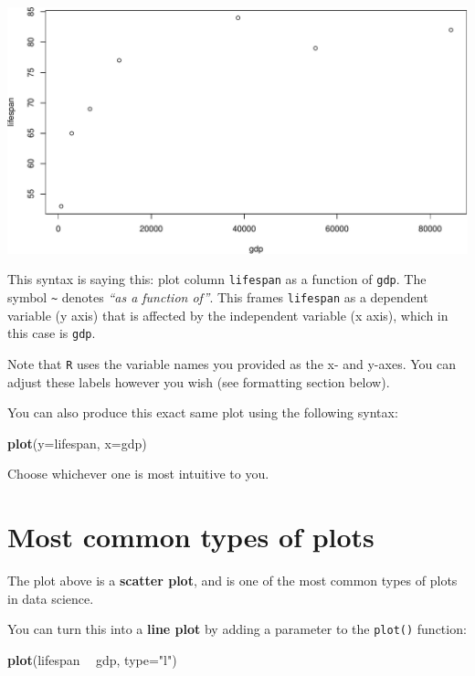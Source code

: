 \documentclass[
]{book}
\newenvironment{Shaded}{\begin{snugshade}}{\end{snugshade}}
\newcommand{\DataTypeTok}[1]{\textcolor[rgb]{0.13,0.29,0.53}{#1}}
\newcommand{\KeywordTok}[1]{\textcolor[rgb]{0.13,0.29,0.53}{\textbf{#1}}}
\newcommand{\NormalTok}[1]{#1}
\newcommand{\OperatorTok}[1]{\textcolor[rgb]{0.81,0.36,0.00}{\textbf{#1}}}
\newcommand{\StringTok}[1]{\textcolor[rgb]{0.31,0.60,0.02}{#1}}
\begin{document}
\includegraphics{figures/unnamed-chunk-95-1.pdf}

This syntax is saying this: plot column \texttt{lifespan} as a function of \texttt{gdp}. The symbol \texttt{\textasciitilde{}} denotes \emph{``as a function of''}. This frames \texttt{lifespan} as a dependent variable (y axis) that is affected by the independent variable (x axis), which in this case is \texttt{gdp}.

Note that \texttt{R} uses the variable names you provided as the x- and y-axes. You can adjust these labels however you wish (see formatting section below).

You can also produce this exact same plot using the following syntax:

\begin{Shaded}
\begin{Highlighting}[]
\KeywordTok{plot}\NormalTok{(}\DataTypeTok{y=}\NormalTok{lifespan, }\DataTypeTok{x=}\NormalTok{gdp)}
\end{Highlighting}
\end{Shaded}

Choose whichever one is most intuitive to you.

\hypertarget{most-common-types-of-plots}{%
\section*{Most common types of plots}\label{most-common-types-of-plots}}

The plot above is a \textbf{scatter plot}, and is one of the most common types of plots in data science.

You can turn this into a \textbf{line plot} by adding a parameter to the \texttt{plot()} function:

\begin{Shaded}
\begin{Highlighting}[]
\KeywordTok{plot}\NormalTok{(lifespan }\OperatorTok{~}\StringTok{ }\NormalTok{gdp, }\DataTypeTok{type=}\StringTok{"l"}\NormalTok{)}
\end{Highlighting}
\end{Shaded}
\end{document}
